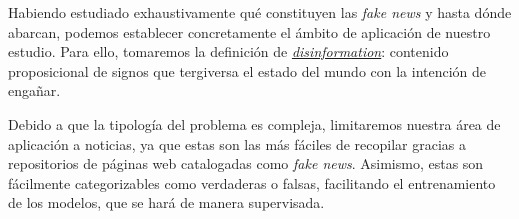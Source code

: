 Habiendo estudiado exhaustivamente qué constituyen las \emph{fake news} y hasta dónde abarcan, podemos establecer concretamente el ámbito de aplicación de nuestro estudio. Para ello, tomaremos la definición de \emph{\underline{disinformation}}: contenido proposicional de signos que tergiversa el estado del mundo con la intención de engañar.

Debido a que la tipología del problema es compleja, limitaremos nuestra área de aplicación a noticias, ya que estas son las más fáciles de recopilar gracias a repositorios de páginas web catalogadas como \emph{fake news}. Asimismo, estas son fácilmente categorizables como verdaderas o falsas, facilitando el entrenamiento de los modelos, que se hará de manera supervisada.